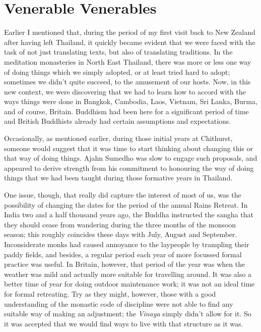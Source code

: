\chapter{Venerable Venerables}

Earlier I mentioned that, during the period of my first visit back to
New Zealand after having left Thailand, it quickly became evident that
we were faced with the task of not just translating texts, but also of
translating traditions. In the meditation monasteries in North East
Thailand, there was more or less one way of doing things which we simply
adopted, or at least tried hard to adopt; sometimes we didn't quite
succeed, to the amusement of our hosts. Now, in this new context, we
were discovering that we had to learn how to accord with the ways things
were done in Bangkok, Cambodia, Laos, Vietnam, Sri Lanka, Burma, and of
course, Britain. Buddhism had been here for
a significant period of time\cite{uk-buddhism}
and British Buddhists already had certain assumptions and expectations.

Occasionally, as mentioned earlier, during those initial years at
Chithurst, someone would suggest that it was time to start thinking
about changing this or that way of doing things. Ajahn Sumedho was slow
to engage such proposals, and appeared to derive strength from his
commitment to honouring the way of doing things that we had been taught
during those formative years in Thailand.

One issue, though, that really did capture the interest of most of us,
was the possibility of changing the dates for the period of the annual
Rains Retreat. In India two and a half thousand years ago, the Buddha
instructed the sangha that they should cease from wandering during the
three months of the monsoon season; this roughly coincides these days
with July, August and September. Inconsiderate monks had caused
annoyance to the laypeople by trampling their paddy fields, and besides,
a regular period each year of more focussed formal practice was useful.
In Britain, however, that period of the year was when the weather was
mild and actually more suitable for travelling around. It was also a
better time of year for doing outdoor maintenance work; it was not an
ideal time for formal retreating. Try as they might, however, those with
a good understanding of the monastic code of discipline were not able to
find any suitable way of making an adjustment; the \emph{Vinaya} simply
didn't allow for it. So it was accepted that we would find ways to live
with that structure as it was.

